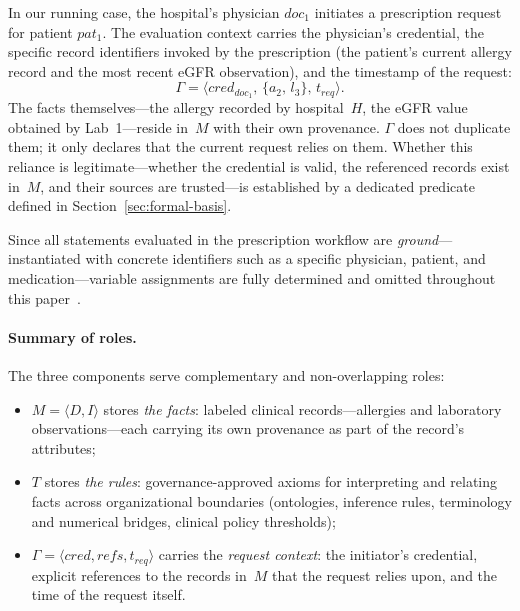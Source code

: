 \documentclass[journal]{IEEEtran}
\begin{document}
In our running case, the hospital's physician
$\mathit{doc_1}$ initiates a prescription request for patient
$\mathit{pat_1}$. The evaluation context carries the physician's credential, the specific record identifiers
invoked by the prescription (the patient's current allergy
record and the most recent eGFR observation), and the timestamp
of the request:
\[
  \Gamma = \langle \mathit{cred}_{\mathit{doc_1}},\,
                   \{a_2,\, l_3\},\,
                   \mathit{t_{req}}
           \rangle.
\]
The facts themselves---the allergy recorded by hospital~$H$, the
eGFR value obtained by Lab~1---reside in~$M$ with their own
provenance. $\Gamma$ does not duplicate them; it
only declares that the current request relies on them. Whether
this reliance is legitimate---whether the credential is valid,
the referenced records exist in~$M$, and their sources are
trusted---is established by
a dedicated predicate defined in Section~\ref{sec:formal-basis}.

Since all statements evaluated in the prescription workflow are
\emph{ground}---instantiated with concrete identifiers such as
a specific physician, patient, and medication---variable
assignments are fully determined and omitted throughout this
paper~\cite{hodges1997shorter}.

\paragraph{Summary of roles.}

The three components serve complementary and non-overlapping
roles:
\begin{itemize}
  \item $M = \langle D, I \rangle$ stores \emph{the facts}:
        labeled clinical records---allergies and laboratory
        observations---each
        carrying its own provenance as part of
        the record's attributes;
  \item $T$ stores \emph{the rules}: governance-approved axioms
        for interpreting and relating facts across organizational
        boundaries (ontologies, inference rules, terminology and
        numerical bridges, clinical policy thresholds);
  \item $\Gamma = \langle \mathit{cred}, \mathit{refs},
        \mathit{t_{req}} \rangle$ carries the \emph{request
        context}: the initiator's credential, explicit
        references to the records in~$M$ that the request
        relies upon, and the time of the request itself.
\end{itemize}
\end{document}
